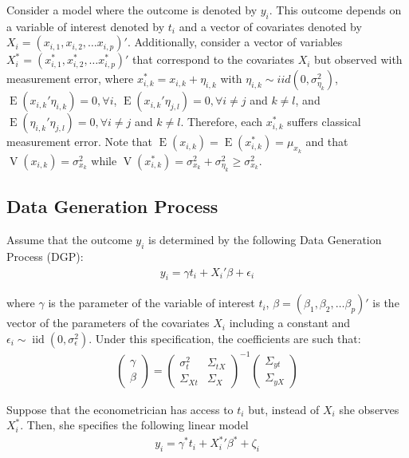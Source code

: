 \documentclass[12pt]{article}
\def\b{\beta}
\def\g{\gamma}
\begin{document}
Consider a model where the outcome is denoted by $y_i$. This outcome depends on a variable of interest denoted by $t_i$ and a vector of covariates denoted by $X_i=(x_{i,1},x_{i,2},\dots x_{i,p})'$. Additionally, consider a vector of variables $X^*_i=(x^*_{i,1},x^*_{i,2},\dots x^*_{i,p})'$ that correspond to the covariates $X_i$ but observed with measurement error, where $x^*_{i,k}=x_{i,k}+\eta_{i,k}$ with $\eta_{i,k} \sim {iid}(0,\sigma^2_{\eta_k})$, $\operatorname{E}(x_{i,k}'\eta_{i,k})=0, \forall i$, $\operatorname{E}(x_{i,k}'\eta_{j,l})=0, \forall i\neq j$ and $k \neq l$, and $\operatorname{E}(\eta_{i,k}'\eta_{j,l})=0, \forall i\neq j$ and $k \neq l$. Therefore, each $x^*_{i,k}$ suffers classical measurement error. Note that $\operatorname{E}(x_{i,k})=\operatorname{E}(x^*_{i,k})=\mu_{x_k}$ and that $\operatorname{V}(x_{i,k})=\sigma^2_{x_k}$ while $\operatorname{V}(x^*_{i,k})=\sigma^2_{x_k}+\sigma^2_{\eta_k}\geq \sigma^2_{x_k}$.

\subsection*{Data Generation Process}

Assume that the outcome $y_i$ is determined by the following Data Generation Process (DGP):
\begin{align}
    y_i = \gamma t_i + X_i'\beta + \epsilon_i
\end{align}

where $\g$ is the parameter of the variable of interest $t_i$, $\b=(\b_1,\b_2,\dots \b_p)'$ is the vector of the parameters of the covariates $X_i$ including a constant and $\epsilon_i \sim \operatorname{iid}(0,\sigma^2_\epsilon)$. Under this specification, the coefficients are such that:
\begin{align}
    \left(\begin{array}{l}
{\gamma} \\
{\beta}
\end{array}\right)=\left(\begin{array}{cc}
{\sigma}^2_{t} & \Sigma_{tX} \\
\Sigma_{Xt} & {\Sigma}_{X}
\end{array}\right)^{-1}\left(\begin{array}{c}
\Sigma_{yt} \\
\Sigma_{yX}
\end{array}\right)
\end{align}

Suppose that the econometrician has access to $t_i$ but, instead of $X_i$ she observes $X^*_i$. Then, she specifies the following linear model
\begin{align}
    y_i = \gamma^* t_i + {X^{*}_i}' \beta^* + \zeta_i
\end{align}
\end{document}
